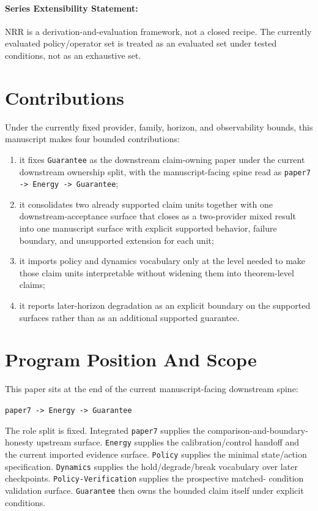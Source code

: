 \documentclass[11pt]{article}
\begin{document}
\paragraph{Series Extensibility Statement:}
NRR is a derivation-and-evaluation framework, not a closed recipe. The currently
evaluated policy/operator set is treated as an evaluated set under tested
conditions, not as an exhaustive set.

\section{Contributions}

Under the currently fixed provider, family, horizon, and observability bounds,
this manuscript makes four bounded contributions:

\begin{enumerate}
\item it fixes \texttt{Guarantee} as the downstream claim-owning paper under the
current downstream ownership split, with the manuscript-facing spine read as
\texttt{paper7 -> Energy -> Guarantee};
\item it consolidates two already supported claim units together with one
downstream-acceptance surface that closes as a two-provider mixed result into
one manuscript
surface with explicit supported behavior, failure boundary, and unsupported
extension for each unit;
\item it imports policy and dynamics vocabulary only at the level needed to make
those claim units interpretable without widening them into theorem-level claims;
\item it reports later-horizon degradation as an explicit boundary on the
supported surfaces rather than as an additional supported guarantee.
\end{enumerate}

\section{Program Position And Scope}

This paper sits at the end of the current manuscript-facing downstream spine:

\begin{center}
\texttt{paper7 -> Energy -> Guarantee}
\end{center}

\noindent The role split is fixed. Integrated \texttt{paper7} supplies the
comparison-and-boundary-honesty upstream surface. \texttt{Energy} supplies the
calibration/control handoff and the current imported evidence surface.
\texttt{Policy} supplies the minimal state/action specification.
\texttt{Dynamics} supplies the hold/degrade/break vocabulary over later
checkpoints. \texttt{Policy-Verification} supplies the prospective matched-
condition validation surface. \texttt{Guarantee} then owns the bounded claim
itself under explicit conditions.
\end{document}
